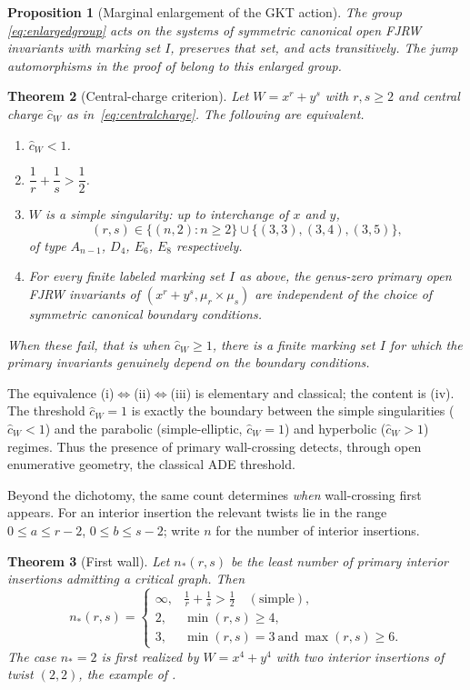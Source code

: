\documentclass[11pt]{amsart}
\newtheorem{theorem}{Theorem}[section]
\newtheorem{proposition}[theorem]{Proposition}
\theoremstyle{definition}
\theoremstyle{remark}
\newcommand{\chat}{\hat{c}}
\begin{document}
\begin{proposition}[Marginal enlargement of the GKT action]
\label{prop:enlargedaction}
The group \eqref{eq:enlargedgroup} acts on the systems of symmetric canonical
open FJRW invariants with marking set $I$, preserves that set, and acts
transitively.  The jump automorphisms in the proof of
\cite[Thm.~5.9]{GKT} belong to this enlarged group.
\end{proposition}

\begin{theorem}[Central-charge criterion]
\label{thm:main}
Let $W=x^{r}+y^{s}$ with $r,s\geq2$ and central charge $\chat_{W}$ as
in~\eqref{eq:centralcharge}. The following are equivalent.
\begin{enumerate}
\item[(i)] $\chat_{W}<1$.
\item[(ii)] $\dfrac1r+\dfrac1s>\dfrac12$.
\item[(iii)] $W$ is a simple singularity: up to interchange of $x$ and $y$,
\[
(r,s)\in\{(n,2):n\geq2\}\cup\{(3,3),(3,4),(3,5)\},
\]
of type $A_{n-1}$, $D_{4}$, $E_{6}$, $E_{8}$ respectively.
\item[(iv)] For every finite labeled marking set $I$ as above, the genus-zero primary
open FJRW invariants of $(x^{r}+y^{s},\mu_{r}\times\mu_{s})$ are independent of
the choice of symmetric canonical boundary conditions.
\end{enumerate}
When these fail, that is when $\chat_{W}\geq1$, there is a finite marking set
$I$ for which the primary invariants genuinely depend on the boundary
conditions.
\end{theorem}


The equivalence (i)$\Leftrightarrow$(ii)$\Leftrightarrow$(iii) is elementary and
classical; the content is (iv). The threshold $\chat_{W}=1$ is exactly the
boundary between the simple singularities ($\chat_{W}<1$) and the parabolic
(simple-elliptic, $\chat_{W}=1$) and hyperbolic ($\chat_{W}>1$) regimes. Thus
the presence of primary wall-crossing detects, through open enumerative
geometry, the classical ADE threshold.

Beyond the dichotomy, the same count determines \emph{when} wall-crossing first
appears. For an interior insertion the relevant twists lie in the range
$0\leq a\leq r-2$, $0\leq b\leq s-2$; write $n$ for the number of interior
insertions.

\begin{theorem}[First wall]
\label{thm:firstwall}
Let $n_{*}(r,s)$ be the least number of primary interior insertions admitting a
critical graph. Then
\[
n_{*}(r,s)=
\begin{cases}
\infty, & \tfrac1r+\tfrac1s>\tfrac12\quad(\text{simple}),\\[2pt]
2, & \min(r,s)\geq 4,\\[2pt]
3, & \min(r,s)=3\ \text{and}\ \max(r,s)\geq 6.
\end{cases}
\]
The case $n_{*}=2$ is first realized by $W=x^{4}+y^{4}$ with two interior
insertions of twist $(2,2)$, the example of \cite[\S6]{GKTsurvey}.
\end{theorem}
\end{document}
